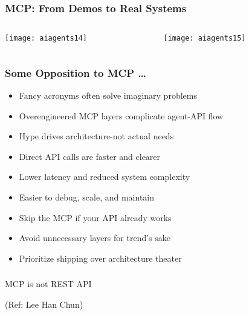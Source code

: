 \begin{frame}[fragile]\frametitle{MCP: From Demos to Real Systems}

\begin{columns}
    \begin{column}[T]{0.5\linewidth}
		\begin{center}
		\texttt{[image: aiagents14]}
		\end{center}

    \end{column}
    \begin{column}[T]{0.5\linewidth}
		\begin{center}
		\texttt{[image: aiagents15]}
		\end{center}
    \end{column}
  \end{columns}
  


\end{frame}

\begin{frame}[fragile]\frametitle{Some Opposition to MCP \ldots}
    \begin{itemize}
        \item Fancy acronyms often solve imaginary problems
        \item Overengineered MCP layers complicate agent-API flow
        \item Hype drives architecture-not actual needs
        \item Direct API calls are faster and clearer
        \item Lower latency and reduced system complexity
        \item Easier to debug, scale, and maintain	
		\item Skip the MCP if your API already works
        \item Avoid unnecessary layers for trend's sake
        \item Prioritize shipping over architecture theater
    \end{itemize}
\end{frame}


\begin{frame}[fragile]\frametitle{}
\begin{center}
{\Large MCP is not REST API}

{\tiny (Ref: Lee Han Chun)}
\end{center}
\end{frame}

